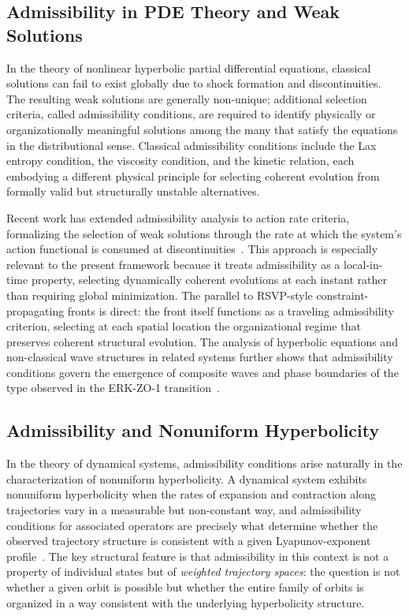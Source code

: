 \documentclass[11pt,a4paper]{article}
\theoremstyle{plain}
\theoremstyle{definition}
\begin{document}
\subsection{Admissibility in PDE Theory and Weak Solutions}

In the theory of nonlinear hyperbolic partial differential equations, classical solutions
can fail to exist globally due to shock formation and discontinuities. The resulting
weak solutions are generally non-unique; additional selection criteria, called admissibility
conditions, are required to identify physically or organizationally meaningful solutions
among the many that satisfy the equations in the distributional sense. Classical
admissibility conditions include the Lax entropy condition, the viscosity condition,
and the kinetic relation, each embodying a different physical principle for selecting
coherent evolution from formally valid but structurally unstable alternatives.

Recent work has extended admissibility analysis to action rate criteria, formalizing the
selection of weak solutions through the rate at which the system's action functional is
consumed at discontinuities~\cite{Gimperlein2026}. This approach is especially relevant
to the present framework because it treats admissibility as a local-in-time property,
selecting dynamically coherent evolutions at each instant rather than requiring global
minimization. The parallel to RSVP-style constraint-propagating fronts is direct: the
front itself functions as a traveling admissibility criterion, selecting at each spatial
location the organizational regime that preserves coherent structural evolution. The
analysis of hyperbolic equations and non-classical wave structures in related systems
further shows that admissibility conditions govern the emergence of composite waves and
phase boundaries of the type observed in the ERK-ZO-1 transition~\cite{ElAbbassi2025}.

\subsection{Admissibility and Nonuniform Hyperbolicity}

In the theory of dynamical systems, admissibility conditions arise naturally in the
characterization of nonuniform hyperbolicity. A dynamical system exhibits nonuniform
hyperbolicity when the rates of expansion and contraction along trajectories vary in
a measurable but non-constant way, and admissibility conditions for associated operators
are precisely what determine whether the observed trajectory structure is consistent
with a given Lyapunov-exponent profile~\cite{Chemnitz2025}. The key structural feature
is that admissibility in this context is not a property of individual states but of
\emph{weighted trajectory spaces}: the question is not whether a given orbit is possible
but whether the entire family of orbits is organized in a way consistent with the
underlying hyperbolicity structure.
\end{document}
